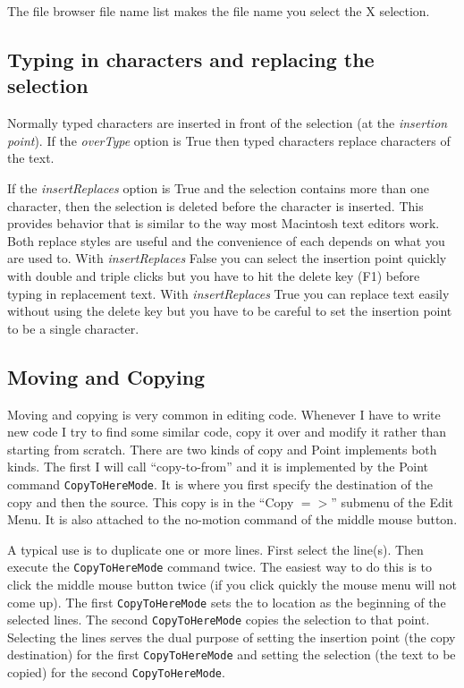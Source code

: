 The file browser file name list makes the file name you select
the X selection.



\subsection{ Typing in characters and replacing the selection }

Normally typed characters are inserted in front of the selection
(at the {\it insertion point}).
If the {\it overType} option is True then typed characters replace
characters of the text.

If the {\it insertReplaces} option is True and the selection contains
more than one character,
then the selection is deleted before the character is inserted.
This provides behavior that is similar to the way most Macintosh
text editors work.
Both replace styles are useful and the convenience of each
depends on what you are used to.
With {\it insertReplaces} False you can select the insertion point
quickly with double and triple clicks but you have to hit the
delete key (F1) before typing in replacement text.
With {\it insertReplaces} True you can replace text easily without
using the delete key but you have to be careful to set the
insertion point to be a single character.




\subsection{ Moving and Copying }

Moving and copying is very common in editing code.
Whenever I have to write new code I try to find some similar code,
copy it over and modify it rather than starting from scratch.
There are two kinds of copy and Point implements both kinds.
The first I will call ``copy-to-from'' and it is implemented
by the Point command {\tt CopyToHereMode}.
It is where you first specify
the destination of the copy and then the source.
This copy is in the ``Copy $=>$'' submenu of the Edit Menu.
It is also attached to the no-motion command of the middle
mouse button.

A typical use is to duplicate one or more lines.
First select the line(s).
Then execute the {\tt CopyToHereMode} command twice.
The easiest way to do this is to click the middle mouse button twice
(if you click quickly the mouse menu will not come up).
The first {\tt CopyToHereMode} sets the to location as the beginning of
the selected lines.
The second {\tt CopyToHereMode} copies the selection to that point.
Selecting the lines serves the dual purpose of setting the insertion
point (the copy destination) for the first {\tt CopyToHereMode}
and setting the selection (the text to be copied) for the
second {\tt CopyToHereMode}.

